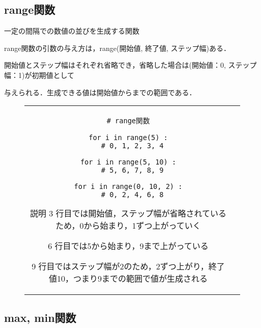 \documentclass{jsarticle}
\begin{document}
\subsection{range関数}
一定の間隔での数値の並びを生成する関数 \par
range関数の引数の与え方は，range(開始値, 終了値, ステップ幅)ある． \par
開始値とステップ幅はそれぞれ省略でき，省略した場合は(開始値：0, ステップ幅：1)が初期値として  \par
与えられる．生成できる値は開始値から{}までの範囲である．
\vspace{-5mm}
\begin{figure}[h]
	\begin{tabular}{cc}
		\begin{minipage}[t]{.4\textwidth}
			\begin{lstlisting}[caption=range関数]
# range関数

for i in range(5) :
  # 0, 1, 2, 3, 4

for i in range(5, 10) :
  # 5, 6, 7, 8, 9

for i in range(0, 10, 2) :
  # 0, 2, 4, 6, 8
\end{lstlisting}
		\end{minipage} \hspace{5mm}
		\begin{minipage}[t]{.6\textwidth}
			\begin{itembox}[l]{説明}
				3 行目では開始値，ステップ幅が省略されているため，0から始まり，1ずつ上がっていく\par
				6 行目では5から始まり，9まで上がっている\par
				9 行目ではステップ幅が2のため，2ずつ上がり，終了値10，つまり9までの範囲で値が生成される
			\end{itembox}
		\end{minipage}
	\end{tabular}
\end{figure}

\subsection{max, min関数}
\end{document}
